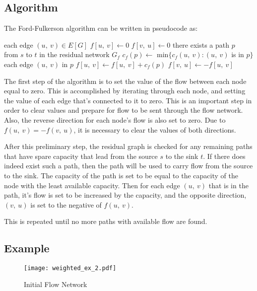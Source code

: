 \documentclass[conference]{IEEEtran}
\begin{document}
\subsection{Algorithm}
The Ford-Fulkerson algorithm can be written in pseudocode\cite{CLRS:2001} as:

\begin{codebox}
\li \For each edge $(u,\ v) \in E[G]$
\li \Do $f[u,\ v] \leftarrow 0$
\li $f[v,\ u] \leftarrow 0$
\End
\li \While there exists a path $p$ \\from $s$ to $t$ in the residual network $G_f$
\li \Do $c_f(p) \leftarrow$ min$\{c_f(u,\ v) : (u,\ v)$ is in $p\}$
\li \For each edge $(u,\ v)$ in $p$
\li \Do $f[u,\ v] \leftarrow f[u,\ v] + c_f(p)$
\li $f[v,\ u] \leftarrow - f[u,\ v]$
\End
\end{codebox}

The first step of the algorithm is to set the value of the flow between each node equal to zero. This is accomplished by iterating through each node, and setting the value of each edge that's connected to it to zero. This is an important step in order to clear values and prepare for flow to be sent through the flow network. Also, the reverse direction for each node's flow is also set to zero. Due to $f(u,\ v) = - f(v,\ u)$, it is necessary to clear the values of both directions.

After this preliminary step, the residual graph is checked for any remaining paths that have spare capacity that lead from the source $s$ to the sink $t$. If there does indeed exist such a path, then the path will be used to carry flow from the source to the sink. The capacity of the path is set to be equal to the capacity of the node with the least available capacity. Then for each edge $(u,\ v)$ that is in the path, it's flow is set to be increased by the capacity, and the opposite direction, $(v,\ u)$ is set to the negative of $f(u,\ v)$.

This is repeated until no more paths with available flow are found.

\subsection{Example}
\begin{figure}[t]                     
\centering                             
\texttt{[image: weighted\_ex\_2.pdf]}
\caption{Initial Flow Network}           
\label{fig:network1}                        
\end{figure}                           
\end{document}
